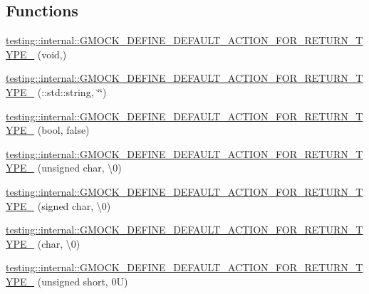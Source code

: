 \subsection*{Functions}
\begin{DoxyCompactItemize}
\item 
\hyperlink{namespacetesting_1_1internal_a8fe6f7c11d6d3dd6e42b75c9a5b43861}{testing\+::internal\+::\+G\+M\+O\+C\+K\+\_\+\+D\+E\+F\+I\+N\+E\+\_\+\+D\+E\+F\+A\+U\+L\+T\+\_\+\+A\+C\+T\+I\+O\+N\+\_\+\+F\+O\+R\+\_\+\+R\+E\+T\+U\+R\+N\+\_\+\+T\+Y\+P\+E\+\_\+} (void,)
\item 
\hyperlink{namespacetesting_1_1internal_a0a961f38f341d40237252babcb3767b7}{testing\+::internal\+::\+G\+M\+O\+C\+K\+\_\+\+D\+E\+F\+I\+N\+E\+\_\+\+D\+E\+F\+A\+U\+L\+T\+\_\+\+A\+C\+T\+I\+O\+N\+\_\+\+F\+O\+R\+\_\+\+R\+E\+T\+U\+R\+N\+\_\+\+T\+Y\+P\+E\+\_\+} (\+::std\+::string, \char`\"{}\char`\"{})
\item 
\hyperlink{namespacetesting_1_1internal_aa6670915f42119e4ba20d8cb74fc1eea}{testing\+::internal\+::\+G\+M\+O\+C\+K\+\_\+\+D\+E\+F\+I\+N\+E\+\_\+\+D\+E\+F\+A\+U\+L\+T\+\_\+\+A\+C\+T\+I\+O\+N\+\_\+\+F\+O\+R\+\_\+\+R\+E\+T\+U\+R\+N\+\_\+\+T\+Y\+P\+E\+\_\+} (bool, false)
\item 
\hyperlink{namespacetesting_1_1internal_ab203e2c4c54f2ca86439344347a3e43f}{testing\+::internal\+::\+G\+M\+O\+C\+K\+\_\+\+D\+E\+F\+I\+N\+E\+\_\+\+D\+E\+F\+A\+U\+L\+T\+\_\+\+A\+C\+T\+I\+O\+N\+\_\+\+F\+O\+R\+\_\+\+R\+E\+T\+U\+R\+N\+\_\+\+T\+Y\+P\+E\+\_\+} (unsigned char, \textquotesingle{}\textbackslash{}0\textquotesingle{})
\item 
\hyperlink{namespacetesting_1_1internal_aaedb3b1b5307625bc84dc660742da3c6}{testing\+::internal\+::\+G\+M\+O\+C\+K\+\_\+\+D\+E\+F\+I\+N\+E\+\_\+\+D\+E\+F\+A\+U\+L\+T\+\_\+\+A\+C\+T\+I\+O\+N\+\_\+\+F\+O\+R\+\_\+\+R\+E\+T\+U\+R\+N\+\_\+\+T\+Y\+P\+E\+\_\+} (signed char, \textquotesingle{}\textbackslash{}0\textquotesingle{})
\item 
\hyperlink{namespacetesting_1_1internal_aeaaa7101572f283fe70a85ad5e6c65dc}{testing\+::internal\+::\+G\+M\+O\+C\+K\+\_\+\+D\+E\+F\+I\+N\+E\+\_\+\+D\+E\+F\+A\+U\+L\+T\+\_\+\+A\+C\+T\+I\+O\+N\+\_\+\+F\+O\+R\+\_\+\+R\+E\+T\+U\+R\+N\+\_\+\+T\+Y\+P\+E\+\_\+} (char, \textquotesingle{}\textbackslash{}0\textquotesingle{})
\item 
\hyperlink{namespacetesting_1_1internal_ab2965a6078670393812e67f8e5fcb072}{testing\+::internal\+::\+G\+M\+O\+C\+K\+\_\+\+D\+E\+F\+I\+N\+E\+\_\+\+D\+E\+F\+A\+U\+L\+T\+\_\+\+A\+C\+T\+I\+O\+N\+\_\+\+F\+O\+R\+\_\+\+R\+E\+T\+U\+R\+N\+\_\+\+T\+Y\+P\+E\+\_\+} (unsigned short, 0\+U)

\end{DoxyCompactItemize}
